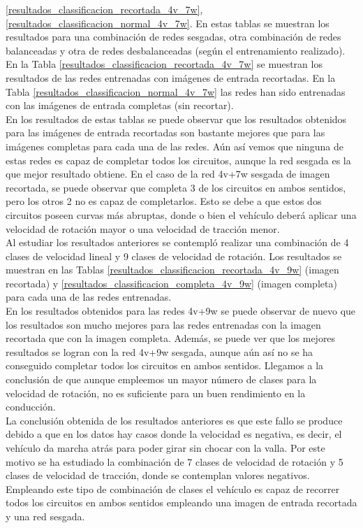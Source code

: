 \ref{resultados_classificacion_recortada_4v_7w}, \ref{resultados_classificacion_normal_4v_7w}. En estas tablas se muestran los resultados para una combinación de redes sesgadas, otra combinación de redes balanceadas y otra de redes desbalanceadas (según el entrenamiento realizado). En la Tabla \ref{resultados_classificacion_recortada_4v_7w} se muestran los resultados de las redes entrenadas con imágenes de entrada recortadas. En la Tabla \ref{resultados_classificacion_normal_4v_7w} las redes han sido entrenadas con las imágenes de entrada completas (sin recortar).\\


En los resultados de estas tablas se puede observar que los resultados obtenidos para las imágenes de entrada recortadas son bastante mejores que para las imágenes completas para cada una de las redes. Aún así vemos que ninguna de estas redes es capaz de completar todos los circuitos, aunque la red sesgada es la que mejor resultado obtiene. En el caso de la red 4v+7w sesgada de imagen recortada, se puede observar que completa 3 de los circuitos en ambos sentidos, pero los otros 2 no es capaz de completarlos. Esto se debe a que estos dos circuitos poseen curvas más abruptas, donde o bien el vehículo deberá aplicar una velocidad de rotación mayor o una velocidad de tracción menor.\\

Al estudiar los resultados anteriores se contempló realizar una combinación de 4 clases de velocidad lineal y 9 clases de velocidad de rotación. Los resultados se muestran en las Tablas \ref{resultados_classificacion_recortada_4v_9w} (imagen recortada) y \ref{resultados_classificacion_completa_4v_9w} (imagen completa) para cada una de las redes entrenadas.\\

En los resultados obtenidos para las redes 4v+9w se puede observar de nuevo que los resultados son mucho mejores para las redes entrenadas con la imagen recortada que con la imagen completa. Además, se puede ver que los mejores resultados se logran con la red 4v+9w sesgada, aunque aún así no se ha conseguido completar todos los circuitos en ambos sentidos. Llegamos a la conclusión de que aunque empleemos un mayor número de clases para la velocidad de rotación, no es suficiente para un buen rendimiento en la conducción.\\

La conclusión obtenida de los resultados anteriores es que este fallo se produce debido a que en los datos hay casos donde la velocidad es negativa, es decir, el vehículo da marcha atrás para poder girar sin chocar con la valla. Por este motivo se ha estudiado la combinación de 7 clases de velocidad de rotación y 5 clases de velocidad de tracción, donde se contemplan valores negativos. Empleando este tipo de combinación de clases el vehículo es capaz de recorrer todos los circuitos en ambos sentidos empleando una imagen de entrada recortada y una red sesgada.\\


